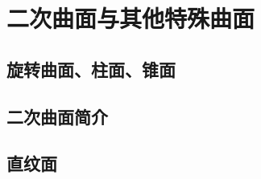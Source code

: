 

\section{二次曲面与其他特殊曲面}
\subsection{旋转曲面、柱面、锥面}
\clearpage
\subsection{二次曲面简介}
\clearpage
\subsection{直纹面}
\clearpage
